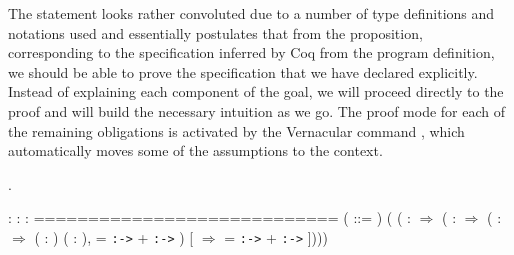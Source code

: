 \coqdocemptyline
The statement looks rather convoluted due to a number of type
definitions and notations used and essentially postulates that from
the proposition, corresponding to the specification inferred by Coq
from the program definition, we should be able to prove the
specification that we have declared explicitly. Instead of explaining
each component of the goal, we will proceed directly to the proof and
will build the necessary intuition as we go.
The proof mode for each of the remaining obligations is activated by
the Vernacular command  , which automatically moves
some of the assumptions to the context.
\begin{coqdoccode}
\coqdocemptyline
\coqdocnoindent
{} .\coqdoceol
\coqdocemptyline
\end{coqdoccode}
\coqdoceol
\coqdocemptyline
\coqdocindent{1.00em}
 : \coqdoceol
\coqdocindent{1.00em}
 : \coqdoceol
\coqdocindent{1.00em}
 : \coqdoceol
\coqdocindent{1.00em}
============================\coqdoceol
\coqdocindent{1.50em}
 ( ::= )\coqdoceol
\coqdocindent{2.50em}
(\coqdoceol
\coqdocindent{4.00em}
(  :  \ensuremath{\Rightarrow}\coqdoceol
\coqdocindent{4.50em}
\coqdoceol
\coqdocindent{5.50em}
(  :  \ensuremath{\Rightarrow}\coqdoceol
\coqdocindent{6.00em}
\coqdoceol
\coqdocindent{7.00em}
(  :  \ensuremath{\Rightarrow}\coqdoceol
\coqdocindent{7.50em}
 ( : ) ( : ),  =  \texttt{:->}  +  \texttt{:->} )\coqdoceol
\coqdocindent{7.00em}
[ \coqdocvar{\_}  \ensuremath{\Rightarrow}  =  \texttt{:->}  +  \texttt{:->} ])))

